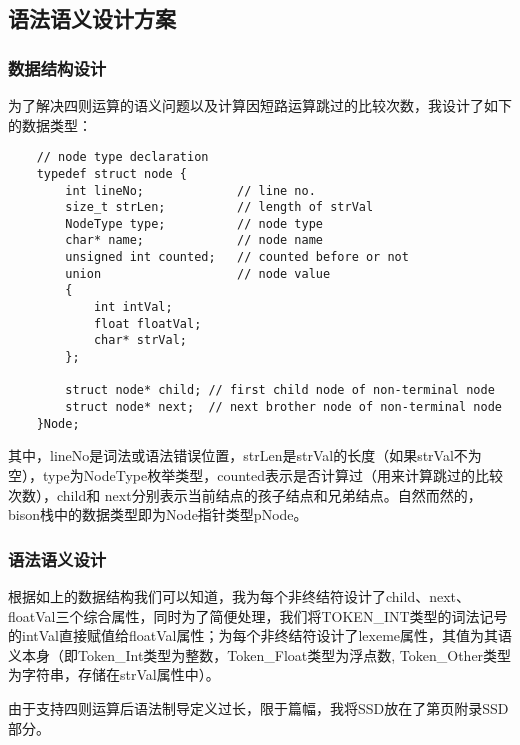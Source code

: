 \documentclass[UTF8,11pt,a4paper]{ctexart}%
\begin{document}
\subsection{语法语义设计方案}
\subsubsection{数据结构设计}
为了解决四则运算的语义问题以及计算因短路运算跳过的比较次数，我设计了如下的数据类型：
\begin{verbatim}
    // node type declaration
    typedef struct node {
        int lineNo;             // line no.
        size_t strLen;          // length of strVal
        NodeType type;          // node type
        char* name;             // node name
        unsigned int counted;   // counted before or not
        union                   // node value
        {
            int intVal;
            float floatVal;
            char* strVal;
        };

        struct node* child; // first child node of non-terminal node
        struct node* next;  // next brother node of non-terminal node
    }Node;
\end{verbatim}
\hspace{2em}其中，lineNo是词法或语法错误位置，strLen是strVal的长度（如果strVal不为空），type为NodeType枚举类型，counted表示是否计算过（用来计算跳过的比较次数），child和
next分别表示当前结点的孩子结点和兄弟结点。自然而然的，bison栈中的数据类型即为Node指针类型pNode。

\subsubsection{语法语义设计}
\hspace{2em}根据如上的数据结构我们可以知道，我为每个非终结符设计了child、next、floatVal三个综合属性，同时为了简便处理，我们将TOKEN\_INT类型的词法记号
的intVal直接赋值给floatVal属性；为每个非终结符设计了lexeme属性，其值为其语义本身（即Token\_Int类型为整数，Token\_Float类型为浮点数, Token\_Other类型为字符串，存储在strVal属性中）。

\hspace{2em}由于支持四则运算后语法制导定义过长，限于篇幅，我将SSD放在了第\pageref{SSD}页附录SSD部分。
\end{document}

